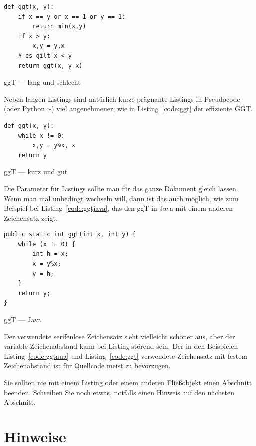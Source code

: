 \documentclass[11pt,a4paper]{report}
\begin{document}
\begin{listing}[ht]
\begin{lstlisting}
def ggt(x, y):
    if x == y or x == 1 or y == 1:
        return min(x,y)
    if x > y:
        x,y = y,x
    # es gilt x < y
    return ggt(x, y-x)
\end{lstlisting}
\caption{ggT --- lang und schlecht}
\label{code:ggtaua}
\end{listing}

Neben langen Listings sind natürlich kurze prägnante
Listings in Pseudocode (oder Python ;-) viel 
angenehmener, wie in Listing~\ref{code:ggt} der
effiziente GGT.

\begin{listing}[htbp]
\begin{lstlisting}
def ggt(x, y):
    while x != 0:
        x,y = y%x, x
    return y
\end{lstlisting}
\caption{ggT --- kurz und gut}
\label{code:ggt}
\end{listing}

Die Parameter für Listings sollte man für das ganze Dokument gleich 
lassen. 
Wenn man mal unbedingt wechseln will, dann ist das auch möglich,
wie zum Beispiel bei Listing~\ref{code:ggtjava}, das den ggT
in Java mit einem anderen Zeichensatz zeigt.

\begin{listing}[htbp]
\lstset{basicstyle=\sffamily, columns=[l]flexible, mathescape=true, showstringspaces=true, numbers=none, language=java}
\begin{lstlisting}
public static int ggt(int x, int y) {
    while (x != 0) {
        int h = x;
        x = y%x;
        y = h;
    }
    return y;
}
\end{lstlisting}
\caption{ggT --- Java}
\label{code:ggtjava}
\end{listing}

Der verwendete serifenlose Zeichensatz sieht vielleicht schöner 
aus, aber der variable Zeichenabstand kann bei Listing störend 
sein. Der in den Beispielen Listing~\ref{code:ggtaua} und 
Listing~\ref{code:ggt} verwendete Zeichensatz mit festem
Zeichenabstand ist für Quellcode meist zu bevorzugen.

Sie sollten nie mit einem Listing oder einem anderen Fließobjekt 
einen Abschnitt beenden. 
Schreiben Sie noch etwas, 
notfalls einen Hinweis auf den nächsten Abschnitt.

\chapter{Hinweise} \label{chap:stil}
\end{document}
